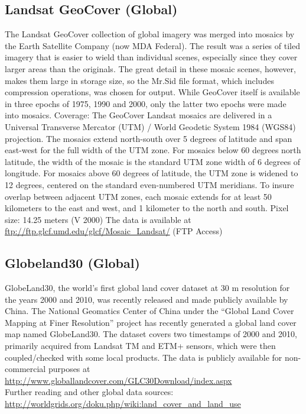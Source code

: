 \documentclass[10pt,b5paper,]{book}
\theoremstyle{definition}
\theoremstyle{definition}
\theoremstyle{definition}
\theoremstyle{remark}
\begin{document}
\hypertarget{landsat-geocover-global}{%
\subsection{Landsat GeoCover (Global)}\label{landsat-geocover-global}}

The Landsat GeoCover collection of global imagery was merged into
mosaics by the Earth Satellite Company (now MDA Federal). The result was
a series of tiled imagery that is easier to wield than individual
scenes, especially since they cover larger areas than the originals. The
great detail in these mosaic scenes, however, makes them large in
storage size, so the Mr.Sid file format, which includes compression
operations, was chosen for output. While GeoCover itself is available in
three epochs of 1975, 1990 and 2000, only the latter two epochs were
made into mosaics. Coverage: The GeoCover Landsat mosaics are delivered
in a Universal Transverse Mercator (UTM) / World Geodetic System 1984
(WGS84) projection. The mosaics extend north-south over 5 degrees of
latitude and span east-west for the full width of the UTM zone. For
mosaics below 60 degrees north latitude, the width of the mosaic is the
standard UTM zone width of 6 degrees of longitude. For mosaics above 60
degrees of latitude, the UTM zone is widened to 12 degrees, centered on
the standard even-numbered UTM meridians. To insure overlap between
adjacent UTM zones, each mosaic extends for at least 50 kilometers to
the east and west, and 1 kilometer to the north and south. Pixel size:
14.25 meters (V 2000) The data is available at
\url{ftp://ftp.glcf.umd.edu/glcf/Mosaic_Landsat/} (FTP Access)

\hypertarget{globeland30-global}{%
\subsection{Globeland30 (Global)}\label{globeland30-global}}

GlobeLand30, the world's first global land cover dataset at 30 m
resolution for the years 2000 and 2010, was recently released and made
publicly available by China. The National Geomatics Center of China
under the ``Global Land Cover Mapping at Finer Resolution'' project has
recently generated a global land cover map named GlobeLand30. The
dataset covers two timestamps of 2000 and 2010, primarily acquired from
Landsat TM and ETM+ sensors, which were then coupled/checked with some
local products. The data is publicly available for non-commercial
purposes at
\url{http://www.globallandcover.com/GLC30Download/index.aspx}\\
Further reading and other global data sources:
\url{http://worldgrids.org/doku.php/wiki:land_cover_and_land_use}
\end{document}
